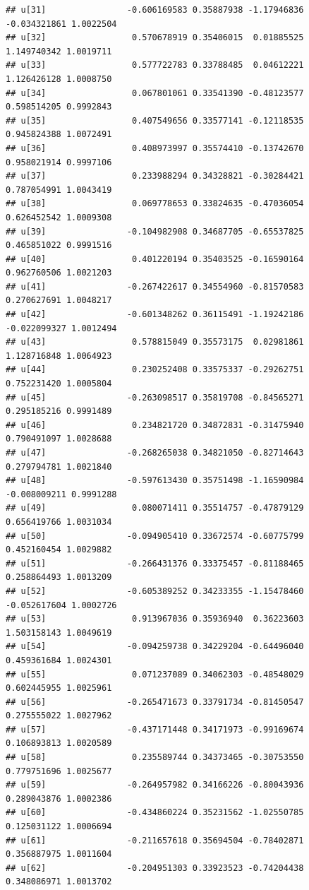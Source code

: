 \documentclass[
]{book}
\begin{document}
\begin{verbatim}
## u[31]                -0.606169583 0.35887938 -1.17946836 -0.034321861 1.0022504
## u[32]                 0.570678919 0.35406015  0.01885525  1.149740342 1.0019711
## u[33]                 0.577722783 0.33788485  0.04612221  1.126426128 1.0008750
## u[34]                 0.067801061 0.33541390 -0.48123577  0.598514205 0.9992843
## u[35]                 0.407549656 0.33577141 -0.12118535  0.945824388 1.0072491
## u[36]                 0.408973997 0.35574410 -0.13742670  0.958021914 0.9997106
## u[37]                 0.233988294 0.34328821 -0.30284421  0.787054991 1.0043419
## u[38]                 0.069778653 0.33824635 -0.47036054  0.626452542 1.0009308
## u[39]                -0.104982908 0.34687705 -0.65537825  0.465851022 0.9991516
## u[40]                 0.401220194 0.35403525 -0.16590164  0.962760506 1.0021203
## u[41]                -0.267422617 0.34554960 -0.81570583  0.270627691 1.0048217
## u[42]                -0.601348262 0.36115491 -1.19242186 -0.022099327 1.0012494
## u[43]                 0.578815049 0.35573175  0.02981861  1.128716848 1.0064923
## u[44]                 0.230252408 0.33575337 -0.29262751  0.752231420 1.0005804
## u[45]                -0.263098517 0.35819708 -0.84565271  0.295185216 0.9991489
## u[46]                 0.234821720 0.34872831 -0.31475940  0.790491097 1.0028688
## u[47]                -0.268265038 0.34821050 -0.82714643  0.279794781 1.0021840
## u[48]                -0.597613430 0.35751498 -1.16590984 -0.008009211 0.9991288
## u[49]                 0.080071411 0.35514757 -0.47879129  0.656419766 1.0031034
## u[50]                -0.094905410 0.33672574 -0.60775799  0.452160454 1.0029882
## u[51]                -0.266431376 0.33375457 -0.81188465  0.258864493 1.0013209
## u[52]                -0.605389252 0.34233355 -1.15478460 -0.052617604 1.0002726
## u[53]                 0.913967036 0.35936940  0.36223603  1.503158143 1.0049619
## u[54]                -0.094259738 0.34229204 -0.64496040  0.459361684 1.0024301
## u[55]                 0.071237089 0.34062303 -0.48548029  0.602445955 1.0025961
## u[56]                -0.265471673 0.33791734 -0.81450547  0.275555022 1.0027962
## u[57]                -0.437171448 0.34171973 -0.99169674  0.106893813 1.0020589
## u[58]                 0.235589744 0.34373465 -0.30753550  0.779751696 1.0025677
## u[59]                -0.264957982 0.34166226 -0.80043936  0.289043876 1.0002386
## u[60]                -0.434860224 0.35231562 -1.02550785  0.125031122 1.0006694
## u[61]                -0.211657618 0.35694504 -0.78402871  0.356887975 1.0011604
## u[62]                -0.204951303 0.33923523 -0.74204438  0.348086971 1.0013702

\end{verbatim}
\end{document}
